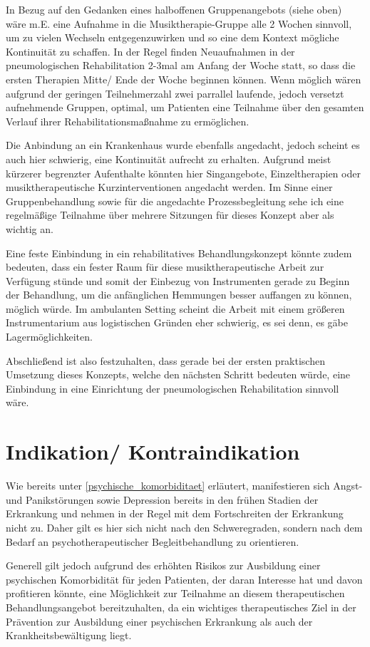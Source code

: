 In Bezug auf den Gedanken eines halboffenen Gruppenangebots (siehe oben) wäre m.E. eine Aufnahme in die Musiktherapie-Gruppe alle 2 Wochen sinnvoll, um zu vielen Wechseln entgegenzuwirken und so eine dem Kontext mögliche Kontinuität zu schaffen. In der Regel finden Neuaufnahmen in der pneumologischen Rehabilitation 2-3mal am Anfang der Woche statt, so dass die ersten Therapien Mitte/ Ende der Woche beginnen können. Wenn möglich wären aufgrund der geringen Teilnehmerzahl zwei parrallel laufende, jedoch versetzt aufnehmende Gruppen, optimal, um Patienten eine Teilnahme über den gesamten Verlauf ihrer Rehabilitationsmaßnahme zu ermöglichen.

Die Anbindung an ein Krankenhaus wurde ebenfalls angedacht, jedoch scheint es auch hier schwierig, eine Kontinuität aufrecht zu erhalten. Aufgrund meist kürzerer begrenzter Aufenthalte könnten hier Singangebote, Einzeltherapien oder musiktherapeutische Kurzinterventionen angedacht werden. Im Sinne einer Gruppenbehandlung sowie für die angedachte Prozessbegleitung sehe ich eine regelmäßige Teilnahme über mehrere Sitzungen für dieses Konzept aber als wichtig an. 

Eine feste Einbindung in ein rehabilitatives Behandlungskonzept könnte zudem bedeuten, dass ein fester Raum für diese musiktherapeutische Arbeit zur Verfügung stünde und somit der Einbezug von Instrumenten gerade zu Beginn der Behandlung, um die anfänglichen Hemmungen besser auffangen zu können, möglich würde. Im ambulanten Setting scheint die Arbeit mit einem größeren Instrumentarium aus logistischen Gründen eher schwierig, es sei denn, es gäbe Lagermöglichkeiten.

Abschließend ist also festzuhalten, dass gerade bei der ersten praktischen Umsetzung dieses Konzepts, welche den nächsten Schritt bedeuten würde, eine Einbindung in eine Einrichtung der pneumologischen Rehabilitation sinnvoll wäre.

\section{Indikation/ Kontraindikation}
Wie bereits unter \ref{psychische_komorbiditaet} erläutert, manifestieren sich Angst- und Panikstörungen sowie Depression bereits in den frühen Stadien der Erkrankung und nehmen in der Regel mit dem Fortschreiten der Erkrankung nicht zu. Daher gilt es hier sich nicht nach den Schweregraden, sondern nach dem Bedarf an psychotherapeutischer Begleitbehandlung zu orientieren. 

Generell gilt jedoch aufgrund des erhöhten Risikos zur Ausbildung einer psychischen Komorbidität für jeden Patienten, der daran Interesse hat und davon profitieren könnte, eine Möglichkeit zur Teilnahme an diesem therapeutischen Behandlungsangebot bereitzuhalten, da ein wichtiges therapeutisches Ziel in der Prävention zur Ausbildung einer psychischen Erkrankung als auch der Krankheitsbewältigung liegt.

